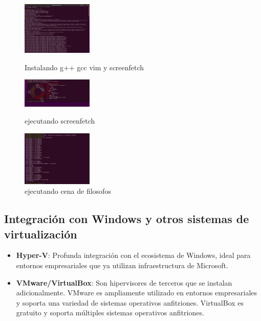 \documentclass[journal]{IEEEtran}
\begin{document}
\begin{figure}[htbp]
  \centering
  \includegraphics[width=0.3\textwidth]{enyel3.jpg}
  \caption{Instalando g++ gcc vim y screenfetch}

  \centering
  \includegraphics[width=0.3\textwidth]{enyel4.jpg}
  \caption{ejecutando screenfetch}


  \centering
  \includegraphics[width=0.3\textwidth]{enyel8.jpg}
  \caption{ejecutando cena de filosofos}
\end{figure}

\FloatBarrier %

\subsection{Integración con Windows y otros sistemas de virtualización}
\begin{itemize}
    \item \textbf{Hyper-V}: Profunda integración con el ecosistema de Windows, ideal para entornos empresariales que ya utilizan infraestructura de Microsoft.
    \item \textbf{VMware/VirtualBox}: Son hipervisores de terceros que se instalan adicionalmente. VMware es ampliamente utilizado en entornos empresariales y soporta una variedad de sistemas operativos anfitriones. VirtualBox es gratuito y soporta múltiples sistemas operativos anfitriones.
\end{itemize}
\end{document}
